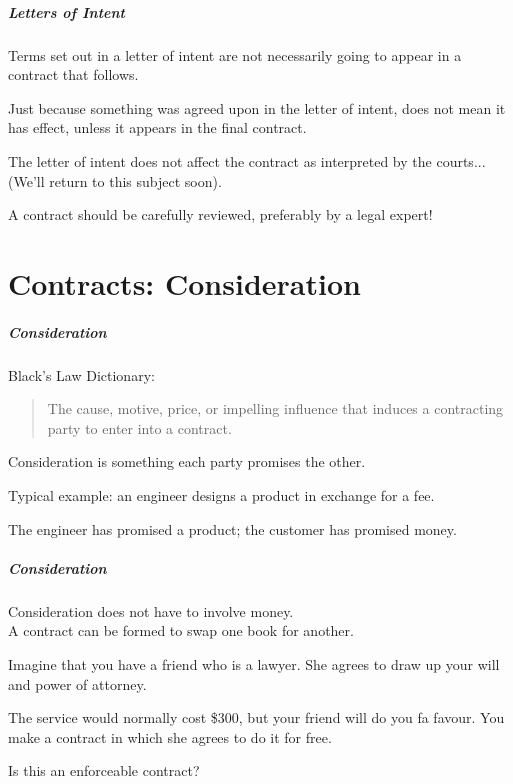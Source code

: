 \begin{frame}
\frametitle{Letters of Intent}

Terms set out in a letter of intent are not necessarily going to appear in a contract that follows.

Just because something was agreed upon in the letter of intent, does not mean it has effect, unless it appears in the final contract.

The letter of intent does not affect the contract as interpreted by the courts...\\
\quad(We'll return to this subject soon).

A contract should be carefully reviewed, preferably by a legal expert!


\end{frame}


\part{Contracts: Consideration}

\begin{frame}
\partpage
\end{frame}



\begin{frame}
\frametitle{Consideration}

Black's Law Dictionary:
\begin{quote}
	The cause, motive, price, or impelling influence that induces a contracting party to enter into a contract.
\end{quote}

\alert{Consideration} is something each party promises the other.

Typical example: an engineer designs a product in exchange for a fee.

The engineer has promised a product; the customer has promised money.

\end{frame}



\begin{frame}
\frametitle{Consideration}

Consideration does not have to involve money.\\
\quad A contract can be formed to swap one book for another.

Imagine that you have a friend who is a lawyer. She agrees to draw up your will and power of attorney. 

The service would normally cost \$300, but your friend will do you fa favour. You make a contract in which she agrees to do it for free.

Is this an enforceable contract?

\end{frame}



